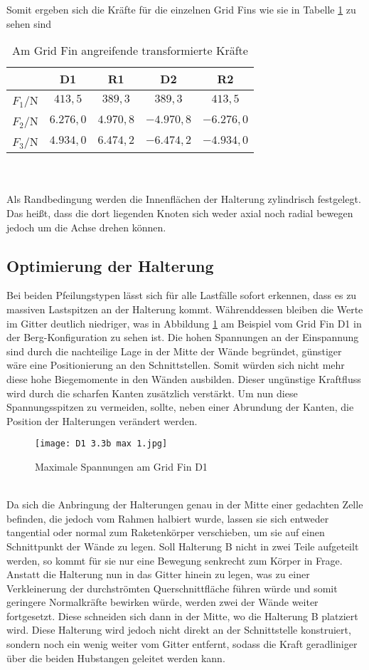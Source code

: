 Somit ergeben sich die Kräfte für die einzelnen Grid Fins wie sie in Tabelle \ref{tab_Fs} zu sehen sind
\begin{table}[ht]
	\centering
	\begin{tabular}{c||c|c|c|c}
		&D1&R1&D2&R2\\
		\hline
		$F_1/$N&$413,5$&$389,3$&$389,3$&$413,5$\\
		$F_2/$N&$6.276,0$&$4.970,8$&$-4.970,8$&$-6.276,0$\\
		$F_3/$N&$4.934,0$&$6.474,2$&$-6.474,2$&$-4.934,0$\\
	\end{tabular}
	\caption{Am Grid Fin angreifende transformierte Kräfte}
	\label{tab_Fs}
\end{table}\\~\\
Als Randbedingung werden die Innenflächen der Halterung zylindrisch festgelegt. Das heißt, dass die dort liegenden Knoten sich weder axial noch radial bewegen jedoch um die Achse drehen können.
\subsection{Optimierung der Halterung}
Bei beiden Pfeilungstypen lässt sich für alle Lastfälle sofort erkennen, dass es zu massiven Lastspitzen an der Halterung kommt. Währenddessen bleiben die Werte im Gitter deutlich niedriger, was in Abbildung \ref{abb_V1-D1} am Beispiel vom Grid Fin D1 in der Berg-Konfiguration zu sehen ist. Die hohen Spannungen an der Einspannung sind durch die nachteilige Lage in der Mitte der Wände begründet, günstiger wäre eine Positionierung an den Schnittstellen. Somit würden sich nicht mehr diese hohe Biegemomente in den Wänden ausbilden. Dieser ungünstige Kraftfluss wird durch die scharfen Kanten zusätzlich verstärkt. Um nun diese Spannungsspitzen zu vermeiden, sollte, neben einer Abrundung der Kanten, die Position der Halterungen verändert werden.
\begin{figure}[h] 
	\centering
	\texttt{[image: D1 3.3b max 1.jpg]}
	\caption{Maximale Spannungen am Grid Fin D1}
	\label{abb_V1-D1}
\end{figure}\\
Da sich die Anbringung der Halterungen genau in der Mitte einer gedachten Zelle befinden, die jedoch vom Rahmen halbiert wurde, lassen sie sich entweder tangential oder normal zum Raketenkörper verschieben, um sie auf einen Schnittpunkt der Wände zu legen. Soll Halterung B nicht in zwei Teile aufgeteilt werden, so kommt für sie nur eine Bewegung senkrecht zum Körper in Frage. Anstatt die Halterung nun in das Gitter hinein zu legen, was zu einer Verkleinerung der durchströmten Querschnittfläche führen würde und somit geringere Normalkräfte bewirken würde, werden zwei der Wände weiter fortgesetzt. Diese schneiden sich dann in der Mitte, wo die Halterung B platziert wird. Diese Halterung wird jedoch nicht direkt an der Schnittstelle konstruiert, sondern noch ein wenig weiter vom Gitter entfernt, sodass die Kraft geradliniger über die beiden Hubstangen geleitet werden kann.

